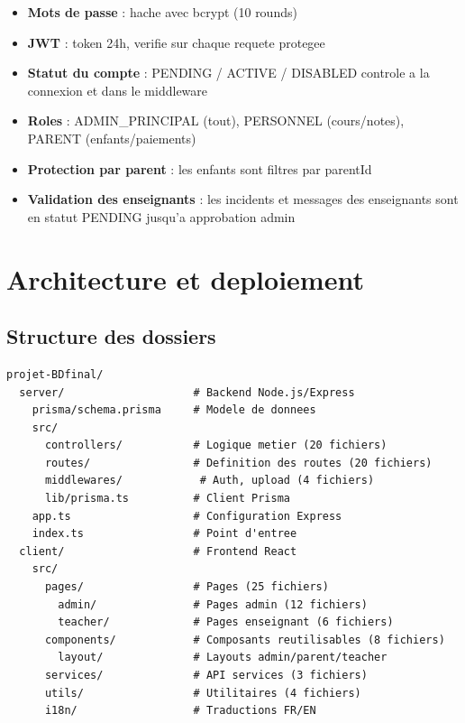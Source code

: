 \documentclass[12pt,a4paper]{article}
\begin{document}
\begin{itemize}
  \item \textbf{Mots de passe} : hache avec bcrypt (10 rounds)
  \item \textbf{JWT} : token 24h, verifie sur chaque requete protegee
  \item \textbf{Statut du compte} : PENDING / ACTIVE / DISABLED controle a la connexion et dans le middleware
  \item \textbf{Roles} : ADMIN\_PRINCIPAL (tout), PERSONNEL (cours/notes), PARENT (enfants/paiements)
  \item \textbf{Protection par parent} : les enfants sont filtres par parentId
  \item \textbf{Validation des enseignants} : les incidents et messages des enseignants sont en statut PENDING jusqu'a approbation admin
\end{itemize}

\newpage

\section{Architecture et deploiement}

\subsection{Structure des dossiers}

\begin{verbatim}
projet-BDfinal/
  server/                    # Backend Node.js/Express
    prisma/schema.prisma     # Modele de donnees
    src/
      controllers/           # Logique metier (20 fichiers)
      routes/                # Definition des routes (20 fichiers)
      middlewares/            # Auth, upload (4 fichiers)
      lib/prisma.ts          # Client Prisma
    app.ts                   # Configuration Express
    index.ts                 # Point d'entree
  client/                    # Frontend React
    src/
      pages/                 # Pages (25 fichiers)
        admin/               # Pages admin (12 fichiers)
        teacher/             # Pages enseignant (6 fichiers)
      components/            # Composants reutilisables (8 fichiers)
        layout/              # Layouts admin/parent/teacher
      services/              # API services (3 fichiers)
      utils/                 # Utilitaires (4 fichiers)
      i18n/                  # Traductions FR/EN
\end{verbatim}
\end{document}
